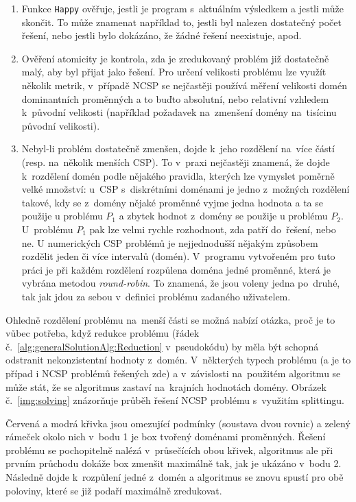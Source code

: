 \begin{enumerate}
    \item Funkce \verb|Happy| ověřuje, jestli je program  s~aktuálním výsledkem a jestli může skončit. To může znamenat například to, jestli byl nalezen dostatečný počet řešení, nebo jestli bylo dokázáno, že žádné řešení neexistuje, apod.
    \item Ověření atomicity je kontrola, zda je zredukovaný problém již dostatečně malý, aby byl přijat jako řešení. Pro určení velikosti problému lze využít několik metrik, v~případě NCSP se nejčastěji používá měření velikosti domén dominantních proměnných a to buďto absolutní, nebo relativní vzhledem k~původní velikosti (například požadavek na~zmenšení domény na~tisícinu původní velikosti).
    \item Nebyl-li problém dostatečně zmenšen, dojde k~jeho rozdělení na~více částí (resp. na~několik menších CSP). To v~praxi nejčastěji znamená, že dojde k~rozdělení domén podle nějakého pravidla, kterých lze vymyslet poměrně velké množství: u~CSP s~diskrétními doménami je jedno z~možných rozdělení takové, kdy se z~domény nějaké proměnné vyjme jedna hodnota a ta se použije u problému $P_1$ a zbytek hodnot z~domény se použije u problému $P_2$. U~problému $P_1$ pak lze velmi rychle rozhodnout, zda patří do~řešení, nebo ne. U numerických CSP problémů je nejjednodušší nějakým způsobem rozdělit jeden či více intervalů (domén). V~programu vytvořeném pro tuto práci je při každém rozdělení rozpůlena doména jedné proměnné, která je vybrána metodou \emph{round-robin}. To znamená, že jsou voleny jedna po~druhé, tak jak jdou za sebou v~definici problému zadaného uživatelem.
\end{enumerate}

Ohledně rozdělení problému na~menší části se možná nabízí otázka, proč je to vůbec potřeba, když redukce problému (řádek č.~\ref{alg:generalSolutionAlg:Reduction} v~pseudokódu) by měla být schopná odstranit nekonzistentní hodnoty z~domén. V~některých typech problému (a je to případ i NCSP problémů řešených zde) a v~závislosti na~použitém algoritmu se může stát, že se algoritmus zastaví na~krajních hodnotách domény. Obrázek č.~\ref{img:solving} znázorňuje průběh řešení NCSP problému s~využitím splittingu.

Červená a modrá křivka jsou omezující podmínky (soustava dvou rovnic) a zelený rámeček okolo nich v~bodu 1 je box tvořený doménami proměnných. Řešení problému se pochopitelně nalézá v~průsečících obou křivek, algoritmus ale při prvním průchodu dokáže box zmenšit maximálně tak, jak je ukázáno v~bodu 2. Následně dojde k~rozpůlení jedné z~domén a algoritmus se znovu spustí pro obě poloviny, které se již podaří maximálně zredukovat.

